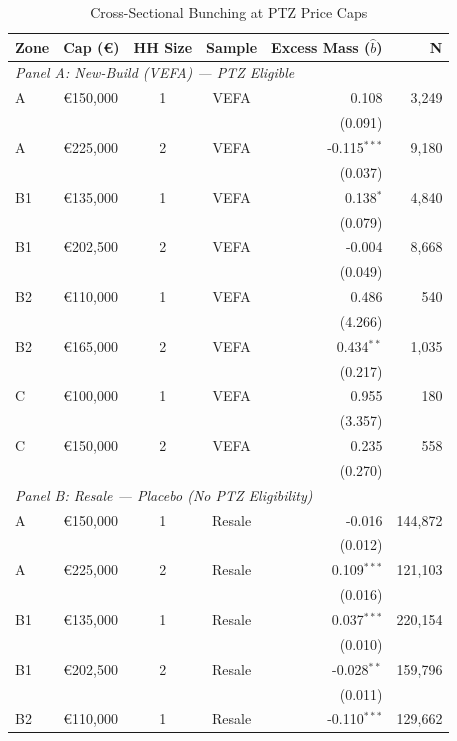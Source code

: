 \begin{table}[H]
\centering
\caption{Cross-Sectional Bunching at PTZ Price Caps}
\label{tab:bunching}
\begin{threeparttable}
\begin{tabular}{llccrr}
\toprule
Zone & Cap (\euro) & HH Size & Sample & Excess Mass ($\hat{b}$) & N \\
\midrule
\multicolumn{6}{l}{\textit{Panel A: New-Build (VEFA) --- PTZ Eligible}} \\[3pt]
A & \euro150,000 & 1 & VEFA & 0.108 & 3,249 \\
 & & & & (0.091) & \\
A & \euro225,000 & 2 & VEFA & -0.115$^{***}$ & 9,180 \\
 & & & & (0.037) & \\
B1 & \euro135,000 & 1 & VEFA & 0.138$^{*}$ & 4,840 \\
 & & & & (0.079) & \\
B1 & \euro202,500 & 2 & VEFA & -0.004 & 8,668 \\
 & & & & (0.049) & \\
B2 & \euro110,000 & 1 & VEFA & 0.486 & 540 \\
 & & & & (4.266) & \\
B2 & \euro165,000 & 2 & VEFA & 0.434$^{**}$ & 1,035 \\
 & & & & (0.217) & \\
C & \euro100,000 & 1 & VEFA & 0.955 & 180 \\
 & & & & (3.357) & \\
C & \euro150,000 & 2 & VEFA & 0.235 & 558 \\
 & & & & (0.270) & \\
\midrule
\multicolumn{6}{l}{\textit{Panel B: Resale --- Placebo (No PTZ Eligibility)}} \\[3pt]
A & \euro150,000 & 1 & Resale & -0.016 & 144,872 \\
 & & & & (0.012) & \\
A & \euro225,000 & 2 & Resale & 0.109$^{***}$ & 121,103 \\
 & & & & (0.016) & \\
B1 & \euro135,000 & 1 & Resale & 0.037$^{***}$ & 220,154 \\
 & & & & (0.010) & \\
B1 & \euro202,500 & 2 & Resale & -0.028$^{**}$ & 159,796 \\
 & & & & (0.011) & \\
B2 & \euro110,000 & 1 & Resale & -0.110$^{***}$ & 129,662 \\

\end{tabular}
\end{threeparttable}
\end{table}

